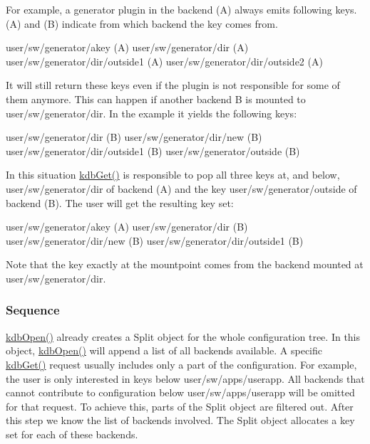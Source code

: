 For example, a generator plugin in the backend (A) always emits following keys. (A) and (B) indicate from which backend the key comes from. \begin{DoxyVerb}    user/sw/generator/akey (A)
    user/sw/generator/dir (A)
    user/sw/generator/dir/outside1 (A)
    user/sw/generator/dir/outside2 (A)
\end{DoxyVerb}


It will still return these keys even if the plugin is not responsible for some of them anymore. This can happen if another backend B is mounted to {\ttfamily user/sw/generator/dir}. In the example it yields the following keys\+: \begin{DoxyVerb}    user/sw/generator/dir (B)
    user/sw/generator/dir/new (B)
    user/sw/generator/dir/outside1 (B)
    user/sw/generator/outside (B)
\end{DoxyVerb}


In this situation {\ttfamily \hyperlink{group__kdb_ga28e385fd9cb7ccfe0b2f1ed2f62453a1}{kdb\+Get()}} is responsible to pop all three keys at, and below, {\ttfamily user/sw/generator/dir} of backend (A) and the key {\ttfamily user/sw/generator/outside} of backend (B). The user will get the resulting key set\+: \begin{DoxyVerb}    user/sw/generator/akey (A)
    user/sw/generator/dir (B)
    user/sw/generator/dir/new (B)
    user/sw/generator/dir/outside1 (B)
\end{DoxyVerb}


Note that the key exactly at the mountpoint comes from the backend mounted at {\ttfamily user/sw/generator/dir}.

\subsubsection*{Sequence}

{\ttfamily \hyperlink{group__kdb_ga6808defe5870f328dd17910aacbdc6ca}{kdb\+Open()}} already creates a {\ttfamily Split} object for the whole configuration tree. In this object, {\ttfamily \hyperlink{group__kdb_ga6808defe5870f328dd17910aacbdc6ca}{kdb\+Open()}} will append a list of all backends available. A specific {\ttfamily \hyperlink{group__kdb_ga28e385fd9cb7ccfe0b2f1ed2f62453a1}{kdb\+Get()}} request usually includes only a part of the configuration. For example, the user is only interested in keys below {\ttfamily user/sw/apps/userapp}. All backends that cannot contribute to configuration below {\ttfamily user/sw/apps/userapp} will be omitted for that request. To achieve this, parts of the {\ttfamily Split} object are filtered out. After this step we know the list of backends involved. The {\ttfamily Split} object allocates a key set for each of these backends.

